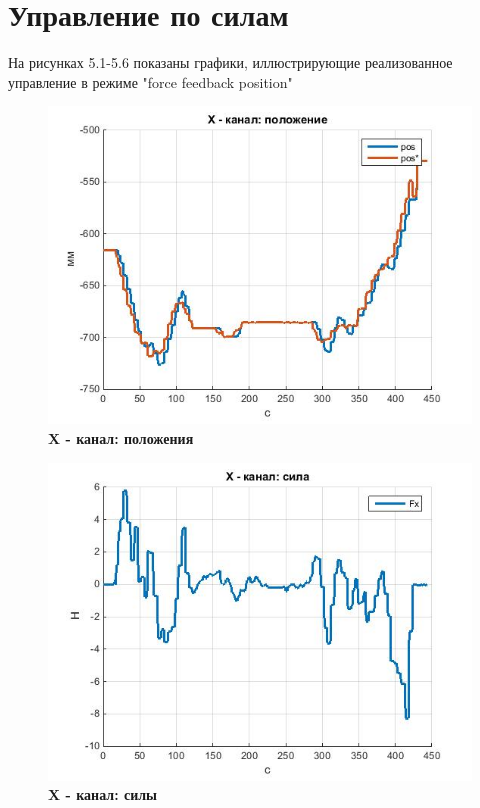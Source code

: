 \documentclass[a4paper,14pt,russian]{extreport} \usepackage{extsizes}
\begin{document}
			\section{Управление по силам}
			На рисунках 5.1-5.6 показаны графики, иллюстрирующие реализованное управление в режиме "force feedback position"
			\begin{figure}[h!]
				\centering		 
				\includegraphics[width=5.5in]{./graph/posX.jpg}	
				\caption{
					\textbf{X - канал: положения}
				}     
				\label{fig_img41}
			\end{figure}
			\begin{figure}[h!]
				\centering		 
				\includegraphics[width=5.5in]{./graph/powX.jpg}	
				\caption{
					\textbf{X - канал: силы}
				}
				\label{fig_img42}
			\end{figure}
\end{document}

